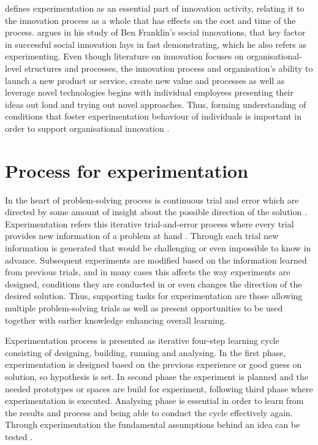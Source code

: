 \citet{thomke1998managing} defines experimentation as an essential part of innovation activity, relating it to the innovation process as a whole that has effects on the cost and time of the process. \citet{mumford2002social} argues in his study of Ben Franklin's social innovations, that key factor in successful social innovation lays in fast demonstrating, which he also refers as experimenting. Even though literature on innovation focuses on organisational-level structures and processes, the innovation process and organisation's ability to launch a new product or service, create new value and processes as well as leverage novel technologies begins with individual employees presenting their ideas out loud and trying out novel approaches. \citep{argote2000knowledge} Thus, forming understanding of conditions that foster experimentation behaviour of individuals is important in order to support organisational innovation \citep{thomke2003r}. 

\section{Process for experimentation}
In the heart of problem-solving process is continuous trial and error which are directed by some amount of insight about the possible direction of the solution \citep{baron2000thinking}. Experimentation refers this iterative trial-and-error process where every trial provides new information of a problem at hand \citep{thomke1998modes}. Through each trial new information is generated that would be challenging or even impossible to know in advance. Subsequent experiments are modified based on the information learned from previous trials, and in many cases this affects the way experiments are designed, conditions they are conducted in or even changes the direction of the desired solution. \citep{thomke1998modes} Thus, supporting tasks for experimentation are those allowing multiple problem-solving trials as well as present opportunities to be used together with earlier knowledge enhancing overall learning. \citep{lee2004mixed}

Experimentation process is presented as iterative four-step learning cycle consisting of designing, building, running and analysing. In the first phase, experimentation is designed based on the previous experience or good guess on solution, so hypothesis is set. In second phase the experiment is planned and the needed prototypes or spaces are build for experiment, following third phase where experimentation is executed. Analysing phase is essential in order to learn from the results and process and being able to conduct the cycle effectively again. \citep{thomke1998managing} Through experimentation the fundamental assumptions behind an idea can be tested \citep{tuulenmaki2011art}.

